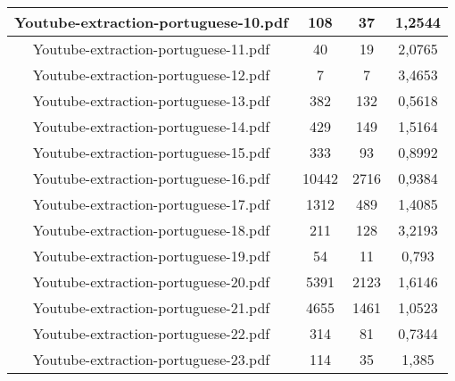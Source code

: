 \documentclass[11pt]{article}
\newlength\mylength
\begin{document}
\begin{center}
\begin{longtable}{||C{.40\mylength}||C{.30\mylength}||C{.30\mylength}||C{.30\mylength}||}
  Youtube-extraction-portuguese-10.pdf & 108 & 37 & 1,2544 \\  \hline
  Youtube-extraction-portuguese-11.pdf & 40 & 19 & 2,0765 \\  \hline
  Youtube-extraction-portuguese-12.pdf & 7 & 7 & 3,4653 \\  \hline
  Youtube-extraction-portuguese-13.pdf & 382 & 132 & 0,5618 \\  \hline
  Youtube-extraction-portuguese-14.pdf & 429 & 149 & 1,5164 \\  \hline
  Youtube-extraction-portuguese-15.pdf & 333 & 93 & 0,8992 \\  \hline
  Youtube-extraction-portuguese-16.pdf & 10442 & 2716 & 0,9384 \\  \hline
  Youtube-extraction-portuguese-17.pdf & 1312 & 489 & 1,4085 \\  \hline
  Youtube-extraction-portuguese-18.pdf & 211 & 128 & 3,2193 \\  \hline
  Youtube-extraction-portuguese-19.pdf & 54 & 11 & 0,793 \\  \hline
  Youtube-extraction-portuguese-20.pdf & 5391 & 2123 & 1,6146 \\  \hline
  Youtube-extraction-portuguese-21.pdf & 4655 & 1461 & 1,0523 \\  \hline
  Youtube-extraction-portuguese-22.pdf & 314 & 81 & 0,7344 \\  \hline
  Youtube-extraction-portuguese-23.pdf & 114 & 35 & 1,385 \\  \hline

\end{longtable}
\end{center}
\end{document}

